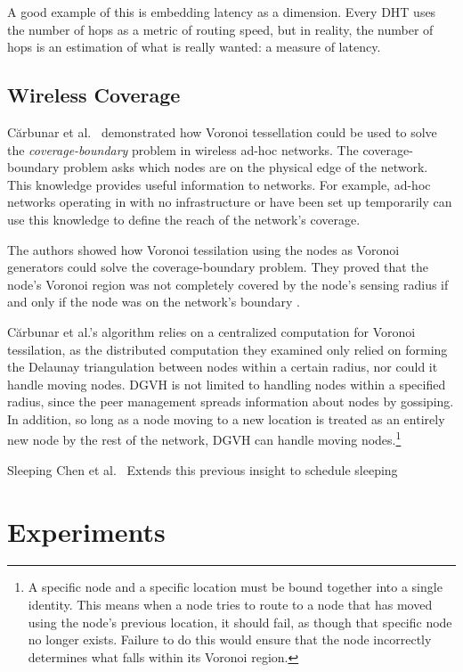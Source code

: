 \documentclass[11pt, conference, letterpaper]{IEEEtran}
\begin{document}
A good example of this is embedding latency as a dimension.
Every DHT uses the number of hops as a metric of routing speed, but in reality, the number of hops is an estimation of what is really wanted: a measure of latency.

\subsection{Wireless Coverage}
C\u{a}rbunar et al.\ \cite{carbunar2004distributed} demonstrated how Voronoi tessellation could be used to solve the \textit{coverage-boundary} problem in wireless ad-hoc networks.
The coverage-boundary problem asks which nodes are on the physical edge of the network.
This knowledge provides useful information to networks.
For example, ad-hoc networks operating in with no infrastructure or have been set up temporarily can use this knowledge to define the reach of the network's coverage.

The authors showed how Voronoi tessilation using the nodes as Voronoi generators could solve the coverage-boundary problem.
They proved that the node's Voronoi region was not completely covered by the node's sensing radius if and only if the node was on the network's boundary \cite{carbunar2004distributed}.

C\u{a}rbunar et al.'s algorithm relies on a centralized computation for Voronoi tessilation, as the distributed computation they examined only relied on forming the Delaunay triangulation between nodes within a certain radius, nor could it handle moving nodes.
DGVH is not limited to handling nodes within a specified radius, since the peer management spreads information about nodes by gossiping. %
In addition, so long as a node moving to a new location is treated as an entirely new node by the rest of the network, DGVH can handle moving nodes.\footnote{A specific node and a specific location must be bound together into a single identity.
This means when a node tries to route to a node that has moved using the node's previous location, it should fail, as though that specific node no longer exists.  
Failure to do this would ensure that the node incorrectly determines what falls within its Voronoi region.}



Sleeping Chen et al.\ \cite{chen2008voronoi}
Extends this previous insight to schedule sleeping


\section{Experiments}
\label{sec:experiments}
\end{document}
